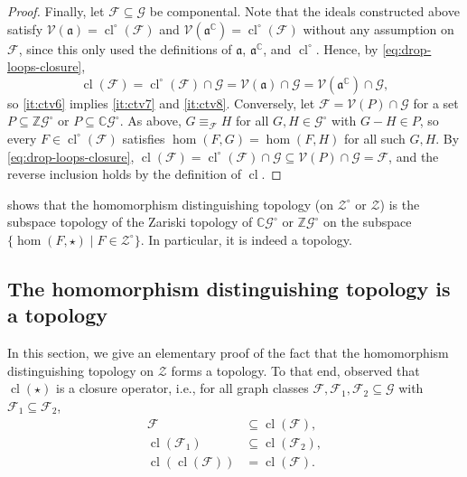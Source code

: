 \documentclass[11pt]{scrartcl}
\theoremstyle{definition}
\theoremstyle{plain}
\theoremstyle{remark}
\DeclareMathOperator{\cl}{cl}
\newcommand{\lG}{\mathcal{G}^\circ}
\newcommand{\G}{\mathcal{G}}
\newcommand{\lZ}{\mathcal{Z}^\circ}
\newcommand{\Z}{\mathcal{Z}}
\newcommand{\C}{\mathbb{C}}
\begin{document}
\begin{proof}
        Finally, let $\mathcal{F} \subseteq \G$ be componental.
        Note that the ideals constructed above satisfy $\mathcal{V}(\mathfrak{a}) = \cl^\circ(\mathcal{F})$
        and $\mathcal{V}(\mathfrak{a}^{\mathbb{C}}) = \cl^\circ(\mathcal{F})$
        without any assumption on $\mathcal{F}$,
        since this only used the definitions of $\mathfrak{a}$, $\mathfrak{a}^{\mathbb{C}}$, and $\cl^\circ$.
        Hence, by \eqref{eq:drop-loops-closure},
        \[
            \cl(\mathcal{F}) = \cl^\circ(\mathcal{F}) \cap \G = \mathcal{V}(\mathfrak{a}) \cap \G = \mathcal{V}(\mathfrak{a}^{\mathbb{C}}) \cap \G,
        \]
        so \ref{it:ctv6} implies \ref{it:ctv7} and \ref{it:ctv8}.
        Conversely, let $\mathcal{F} = \mathcal{V}(P) \cap \G$ for a set $P \subseteq \mathbb{Z}\lG$ or $P \subseteq \mathbb{C}\lG$.
        As above, $G \equiv_{\mathcal{F}} H$ for all $G, H \in \lG$ with $G - H \in P$,
        so every $F \in \cl^\circ(\mathcal{F})$ satisfies $\hom(F,G) = \hom(F,H)$ for all such $G,H$.
        By \eqref{eq:drop-loops-closure},
        $\cl(\mathcal{F}) = \cl^\circ(\mathcal{F}) \cap \G \subseteq \mathcal{V}(P) \cap \G = \mathcal{F}$,
        and the reverse inclusion holds by the definition of $\cl$.
    \end{proof}


	 shows that the homomorphism distinguishing topology (on $\lZ$ or $\Z$) is the subspace topology of the Zariski topology of $\C\lG$ or $\mathbb{Z}\lG$ on the subspace $\{\hom(F, \star) \mid F \in \lZ\}$.
	In particular, it is indeed a topology.



    \subsection{The homomorphism distinguishing topology is a topology}

    In this section, we give an elementary proof of the fact that the homomorphism distinguishing topology on $\Z$ forms a topology. To that end,
    \textcite{roberson_oddomorphisms_2022}
    observed that $\cl(\star)$ is a closure operator, i.e., for all graph classes $\mathcal{F},\mathcal{F}_1, \mathcal{F}_2 \subseteq \G$ with $\mathcal{F}_1 \subseteq \mathcal{F}_2$,
    \begin{align}
        \mathcal{F} &\subseteq \cl(\mathcal{F}), \label{eq:cl-extensive}\\
        \cl(\mathcal{F}_1) &\subseteq \cl(\mathcal{F}_2), \label{eq:cl-increasing} \\
        \cl(\cl(\mathcal{F})) &= \cl(\mathcal{F}). \label{eq:cl-idempotent}
    \end{align}
\end{document}
